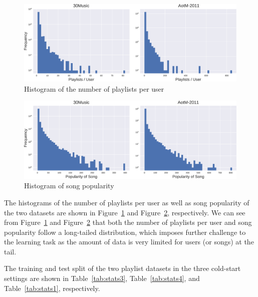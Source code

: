 
%

\begin{figure}[!h]
    \centering
    \includegraphics[width=.98\columnwidth]{fig/hist_pluser.pdf}
    \caption{Histogram of the number of playlists per user}
    \label{fig:hist_pluser}
\end{figure}

\begin{figure}[!h]
    \centering
    \includegraphics[width=.98\columnwidth]{fig/hist_songpop.pdf}
    \caption{Histogram of song popularity}
    \label{fig:hist_songpop}
\end{figure}

The histograms of the number of playlists per user as well as song popularity 
of the two datasets are shown in Figure~\ref{fig:hist_pluser} and Figure~\ref{fig:hist_songpop},
respectively.
We can see from Figure~\ref{fig:hist_pluser} and Figure~\ref{fig:hist_songpop} that both the number
of playlists per user and song popularity follow a long-tailed distribution, which imposes further challenge to the learning task 
as the amount of data is very limited for users (or songs) at the tail.

\newpage

The training and test split of the two playlist datasets in the three cold-start settings are shown in 
Table~\ref{tab:stats3}, Table~\ref{tab:stats4}, and Table~\ref{tab:stats1}, respectively.
%

